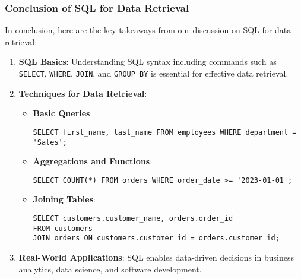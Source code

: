 \documentclass[aspectratio=169]{beamer}
\begin{document}
\begin{frame}[fragile]
    \frametitle{Conclusion of SQL for Data Retrieval}
    In conclusion, here are the key takeaways from our discussion on SQL for data retrieval:
    \begin{enumerate}
        \item \textbf{SQL Basics}: Understanding SQL syntax including commands such as \texttt{SELECT}, \texttt{WHERE}, \texttt{JOIN}, and \texttt{GROUP BY} is essential for effective data retrieval.
        
        \item \textbf{Techniques for Data Retrieval}:
        \begin{itemize}
            \item \textbf{Basic Queries}: 
                \begin{lstlisting}
SELECT first_name, last_name FROM employees WHERE department = 'Sales';
                \end{lstlisting}
            \item \textbf{Aggregations and Functions}: 
                \begin{lstlisting}
SELECT COUNT(*) FROM orders WHERE order_date >= '2023-01-01';
                \end{lstlisting}
            \item \textbf{Joining Tables}: 
                \begin{lstlisting}
SELECT customers.customer_name, orders.order_id 
FROM customers 
JOIN orders ON customers.customer_id = orders.customer_id;
                \end{lstlisting}
        \end{itemize}

        \item \textbf{Real-World Applications}: SQL enables data-driven decisions in business analytics, data science, and software development.
    \end{enumerate}
\end{frame}
\end{document}
